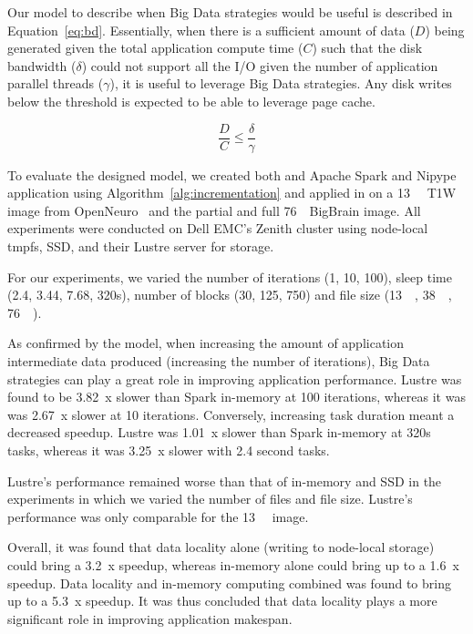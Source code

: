 \documentclass{report}
\begin{document}
        Our model to describe when Big Data strategies would be useful is described in
        Equation~\ref{eq:bd}. Essentially, when there is a sufficient amount of data ($D$)
        being generated given the total application compute time ($C$) such that the disk
        bandwidth ($\delta$) could not support all the I/O given the number of
        application parallel threads ($\gamma$), it is useful to leverage Big Data strategies.
        Any disk writes below the threshold is expected to be able to leverage page cache.


        \begin{equation}\label{eq:bd}
            \frac{D}{C} \le \frac{\delta}{\gamma}
        \end{equation}

        To evaluate the designed model, we created both and Apache Spark and 
        Nipype application using
        Algorithm~\ref{alg:incrementation} and applied in on a \SI{13}{\mega\byte}
        T1W image from OpenNeuro~\cite{openneuro} and the partial
        and full \SI{76}{\gibi\byte}{BigBrain} image. All experiments were conducted
        on Dell EMC's Zenith cluster using node-local tmpfs, SSD,
        and their Lustre server for storage.

        For our experiments, we varied the number of iterations (1, 10, 100),
        sleep time (2.4, 3.44, 7.68, 320s), number of blocks (30, 125, 750) and
        file size (\SI{13}{\mega\byte}, \SI{38}{\gibi\byte}, \SI{76}{\gibi\byte}).
        
        As confirmed by the model, when increasing the amount of application intermediate
        data produced (increasing the number of iterations), Big Data strategies
        can play a great role in improving application performance. Lustre was
        found to be 3.82~x slower than Spark in-memory at 100 iterations, whereas it
        was was 2.67~x slower at 10 iterations. Conversely, increasing task duration
        meant a decreased speedup. Lustre was 1.01~x slower than Spark in-memory
        at 320s tasks, whereas it was 3.25~x slower with 2.4 second tasks.

        Lustre's performance remained worse than that of in-memory and SSD in the
        experiments in which we varied the number of files and file size. Lustre's
        performance was only comparable for the \SI{13}{\mega\byte} image.

        Overall, it was found that data locality alone (writing to node-local storage)
        could bring a 3.2~x speedup,
        whereas in-memory alone could bring up to a 1.6~x speedup. Data locality and
        in-memory computing combined was found to bring up to a 5.3~x speedup.
        It was thus concluded that data locality plays a more significant role in
        improving application makespan.
\end{document}
